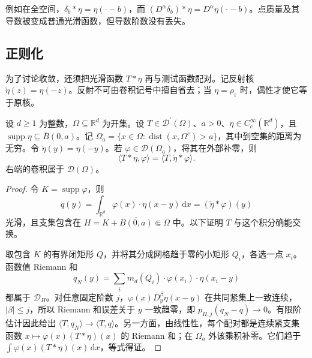 例如在全空间，\(\delta_b*\eta=\eta(\cdot-b)\)，而 \((D^\alpha\delta_b)*\eta=D^\alpha\eta(\cdot-b)\)。点质量及其导数被变成普通光滑函数，但导数阶数没有丢失。

\subsection{正则化}
\label{b1:subsec:200303}

为了讨论收敛，还须把光滑函数 \(T*\eta\) 再与测试函数配对。记反射核 \(\check\eta(z)=\eta(-z)\)。反射不可由卷积记号中擅自省去；当 \(\eta=\rho_\varepsilon\) 时，偶性才使它等于原核。

\begin{proposition}\label{b1:prop:distribution-convolution-pairing}
设 \(d\geq1\) 为整数，\(\Omega\subseteq\mathbb R^d\) 为开集。设 \(T\in\mathcal D^{\prime}(\Omega)\)、\(a>0\)、\(\eta\in C_c^\infty(\mathbb R^d)\)，且 \(\operatorname{supp}\eta\subseteq\overline B(0,a)\)。记 \(\Omega_a=\{x\in\Omega:\operatorname{dist}(x,\Omega^c)>a\}\)，其中到空集的距离为无穷。令 \(\check\eta(y)=\eta(-y)\)。若 \(\varphi\in\mathcal D(\Omega_a)\)，将其在外部补零，则
\[
 \langle T*\eta,\varphi\rangle
 =\langle T,\check\eta*\varphi\rangle.
\]
右端的卷积属于 \(\mathcal D(\Omega)\)。
\end{proposition}
\begin{proof}
令 \(K=\operatorname{supp}\varphi\)，则
\[
 q(y)=\int_{\mathbb R^d}\varphi(x)\cdot\eta(x-y)\,\mathrm dx
 =(\check\eta*\varphi)(y)
\]
光滑，且支集包含在 \(H=K+\overline{B(0,a)}\Subset\Omega\) 中。以下证明 \(T\) 与这个积分确能交换。

取包含 \(K\) 的有界闭矩形 \(Q\)，并将其分成网格趋于零的小矩形 \(Q_i\)，各选一点 \(x_i\)。函数值 Riemann 和
\[
 q_N(y)=\sum_i m_d(Q_i)\cdot\varphi(x_i)\cdot\eta(x_i-y)
\]
都属于 \(\mathcal D_H\)。对任意固定阶数 \(j\)，\(\varphi(x)D_y^\beta\eta(x-y)\) 在共同紧集上一致连续，\(|\beta|\le j\)，所以 Riemann 和误差关于 \(y\) 一致趋零，即 \(p_{H,j}(q_N-q)\to0\)。有限阶估计因此给出 \(\langle T,q_N\rangle\to\langle T,q\rangle\)。另一方面，由线性性，每个配对都是连续紧支集函数 \(x\mapsto\varphi(x)(T*\eta)(x)\) 的 Riemann 和；在 \(\Omega_a\) 外该乘积补零。它们趋于 \(\int\varphi(x)(T*\eta)(x)\,\mathrm dx\)，等式得证。
\end{proof}

